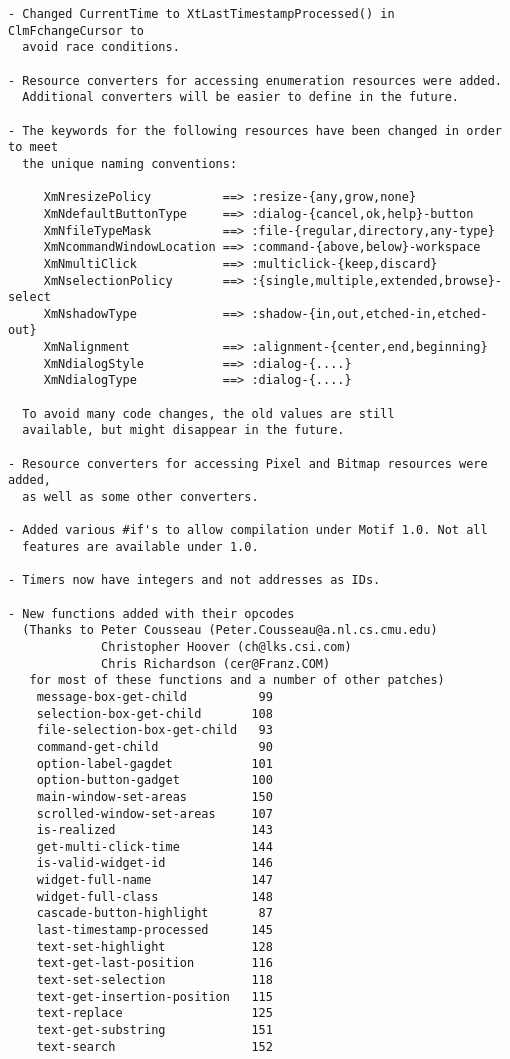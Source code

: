 \small\begin{verbatim}
- Changed CurrentTime to XtLastTimestampProcessed() in ClmFchangeCursor to
  avoid race conditions.

- Resource converters for accessing enumeration resources were added.
  Additional converters will be easier to define in the future.

- The keywords for the following resources have been changed in order to meet
  the unique naming conventions:

     XmNresizePolicy          ==> :resize-{any,grow,none}
     XmNdefaultButtonType     ==> :dialog-{cancel,ok,help}-button
     XmNfileTypeMask          ==> :file-{regular,directory,any-type}
     XmNcommandWindowLocation ==> :command-{above,below}-workspace
     XmNmultiClick            ==> :multiclick-{keep,discard}
     XmNselectionPolicy       ==> :{single,multiple,extended,browse}-select
     XmNshadowType            ==> :shadow-{in,out,etched-in,etched-out}
     XmNalignment             ==> :alignment-{center,end,beginning}
     XmNdialogStyle           ==> :dialog-{....}
     XmNdialogType            ==> :dialog-{....}

  To avoid many code changes, the old values are still
  available, but might disappear in the future.

- Resource converters for accessing Pixel and Bitmap resources were added,
  as well as some other converters.

- Added various #if's to allow compilation under Motif 1.0. Not all
  features are available under 1.0.

- Timers now have integers and not addresses as IDs.

- New functions added with their opcodes
  (Thanks to Peter Cousseau (Peter.Cousseau@a.nl.cs.cmu.edu)
             Christopher Hoover (ch@lks.csi.com)
             Chris Richardson (cer@Franz.COM)
   for most of these functions and a number of other patches)
    message-box-get-child          99
    selection-box-get-child       108
    file-selection-box-get-child   93
    command-get-child              90
    option-label-gagdet           101
    option-button-gadget          100
    main-window-set-areas         150
    scrolled-window-set-areas     107
    is-realized                   143
    get-multi-click-time          144
    is-valid-widget-id            146
    widget-full-name              147
    widget-full-class             148
    cascade-button-highlight       87
    last-timestamp-processed      145
    text-set-highlight            128
    text-get-last-position        116
    text-set-selection            118
    text-get-insertion-position   115
    text-replace                  125
    text-get-substring            151
    text-search                   152


\end{verbatim}
